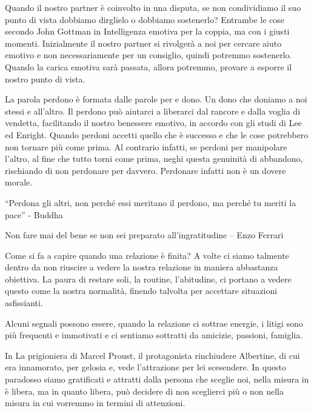 \documentclass[12pt]{book} %
\begin{document}
Quando il nostro partner è coinvolto in una disputa, se non condividiamo il suo punto di vista dobbiamo dirglielo o dobbiamo sostenerlo? Entrambe le cose secondo John Gottman in Intelligenza emotiva per la coppia, ma con i giusti momenti.
Inizialmente il nostro partner si rivolgerà a noi per cercare aiuto emotivo e non necessariamente per un consiglio, quindi potremmo sostenerlo. Quando la carica emotiva sarà passata, allora potremmo, provare a esporre il nostro punto di vista.

La parola perdono è formata dalle parole per e dono. Un dono che doniamo a noi
stessi e all'altro. Il perdono può aiutarci a liberarci dal rancore e dalla voglia di vendetta, facilitando il nostro benessere emotivo, in accordo con gli studi di Lee ed Enright. 
Quando perdoni accetti quello che è successo e che le cose potrebbero non tornare più come prima. Al contrario infatti, se perdoni per manipolare l'altro, al fine che tutto torni come prima, neghi questa genuinità di abbandono, rischiando di non perdonare per davvero. Perdonare infatti non è un dovere morale.

“Perdona gli altri, non perché essi meritano il perdono, ma perché tu meriti la pace” - Buddha

Non fare mai del bene se non sei preparato all'ingratitudine – Enzo Ferrari

Come si fa a capire quando una relazione è finita? A volte ci siamo talmente dentro da non riuscire a vedere la nostra relazione in maniera abbastanza obiettiva. La paura di restare soli, la routine, l'abitudine, ci portano a vedere questo come la nostra normalità, finendo talvolta per accettare situazioni asfissianti. 

Alcuni segnali possono essere, quando la relazione ci sottrae energie, i litigi sono più frequenti e immotivati e ci sentiamo sottratti da amicizie, passioni, famiglia.

In La prigioniera di Marcel Proust, il protagonista rinchiudere Albertine, di cui era innamorato, per gelosia e, vede l'attrazione per lei scesendere. In questo paradosso siamo gratificati e attratti dalla persona che sceglie noi, nella misura in è libera, ma in quanto libera, può decidere di non sceglierci più o non nella misura in cui vorremmo in termini di attenzioni.
\end{document}
